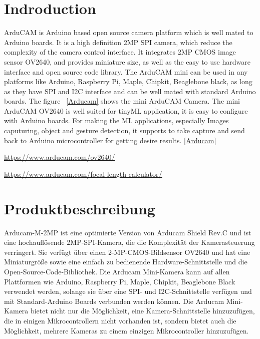 \section{Indroduction}

ArduCAM is Arduino based open source camera platform which is well mated to Arduino boards. It is a high definition 2MP SPI camera, which reduce the complexity of the camera control interface. It integrates 2MP CMOS image sensor OV2640, and provides miniature size, as well as the easy to use hardware interface and open source code library. The ArduCAM mini can be used in any platforms like Arduino, Raspberry Pi, Maple, Chipkit, Beaglebone black, as long as they have SPI and I2C interface and can be well mated with standard Arduino boards. The figure ~\ref{Arducam} shows the mini ArduCAM Camera. The mini ArduCAM OV2640 is well suited for tinyML application, it is easy to configure with Arduino boards. For making the ML applications, especially Images caputuring, object and gesture detection, it supports to take capture and send back to Arduino microcontroller for getting desire results. \href{https://www.arducam.com/product/arducam-2mp-spi-camera-b0067-arduino/}{[Arducam]}



\url{https://www.arducam.com/ov2640/}

\url{https://www.arducam.com/focal-length-calculator/}

\section{Produktbeschreibung}

Arducam-M-2MP ist eine optimierte Version von Arducam Shield Rev.C und ist eine hochauflösende 2MP-SPI-Kamera, die die Komplexität der Kamerasteuerung verringert. Sie verfügt über einen 2-MP-CMOS-Bildsensor OV2640 und hat eine Miniaturgröße sowie eine einfach zu bedienende Hardware-Schnittstelle und die Open-Source-Code-Bibliothek. Die Arducam Mini-Kamera kann auf allen Plattformen wie Arduino, Raspberry Pi, Maple, Chipkit, Beaglebone Black verwendet werden, solange sie über eine SPI- und I2C-Schnittstelle verfügen und mit Standard-Arduino Boards verbunden werden können. Die Arducam Mini-Kamera bietet nicht nur die Möglichkeit, eine Kamera-Schnittstelle hinzuzufügen, die in einigen Mikrocontrollern nicht vorhanden ist, sondern bietet auch die Möglichkeit, mehrere Kameras zu einem einzigen Mikrocontroller hinzuzufügen.

\bigskip

